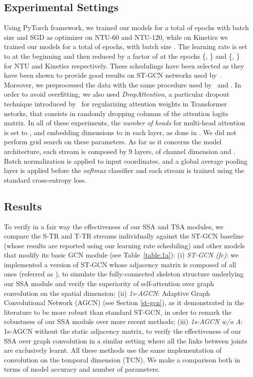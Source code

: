 \documentclass[review]{cvpr}
\begin{document}
\subsection{Experimental Settings} Using PyTorch \cite{paszke2019pytorch} framework, we trained our models for a total of  epochs with batch size  and SGD as optimizer on NTU-60 and NTU-120, while on Kinetics we trained our models for a total of  epochs, with batch size . The learning rate is set to  at the beginning and then reduced by a factor of  at the epochs \{, \} and \{, \} for NTU and Kinetics respectively. These schedulings have been selected as they have been shown to provide good results on ST-GCN networks used by~\cite{dirgraph}. Moreover, we preprocessed the data with the same procedure used by~\cite{Shi2018TwoStreamAG} and \cite{dirgraph}. In order to avoid overfitting, we also used \textit{DropAttention}, a particular dropout technique introduced by~\cite{Lin2019DropAttentionAR} for regularizing attention weights in Transformer netorks, that consists in randomly dropping columns of the attention logits matrix. In all of these experiments, the \textit{number of heads} for multi-head attention is set to , and  embedding dimensions to  in each layer, as done in \cite{DBLP:journals/corr/abs-1904-09925}. We did not perform grid search on these parameters. As far as it concerns the model architecture, each stream is composed by 9 layers, of channel dimension  and . Batch normalization is applied to input coordinates, and a global average pooling layer is applied before the \textit{softmax} classifier and each stream is trained using the standard cross-entropy loss.








\subsection{{Results}}

To verify in a fair way the effectiveness of our SSA and TSA modules, we compare the S-TR and T-TR streams individually against the ST-GCN \cite{yan2018spatial} baseline (whose results are reported using our learning rate scheduling) and other models that modify its basic GCN module (see Table~\ref{table:1a}): (i) \textit{ST-GCN (fc)}: we implemented a version of ST-GCN whose adjacency matrix is composed of all ones (referred as ), to simulate the fully-connected skeleton structure underlying our SSA module and verify the superiority of self-attention over graph convolution on the spatial dimension; (ii) \textit{1s-AGCN}: Adaptive Graph Convolutional Network (AGCN) \cite{Shi2018TwoStreamAG} (see Section \ref{st-gcn}), as it demonstrated in the literature to be more robust than standard ST-GCN, in order to remark the robustness of our SSA module over more recent methods; (iii) \textit{1s-AGCN w/o A}: 1s-AGCN without the static adjacency matrix, to verify the effectiveness of our SSA over graph convolution in a similar setting where all the links between joints are exclusively learnt. 
All these methods use the same implementation of convolution on the temporal dimension (TCN). We make a comparison both in terms of model accuracy and number of parameters.
\end{document}
